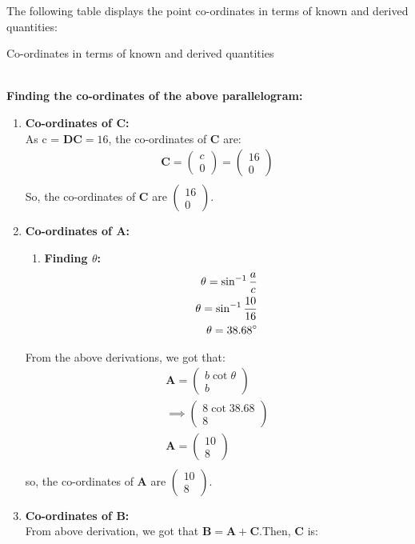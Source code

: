 \documentclass{article}
\newcommand{\myvec}[1]{\ensuremath{\begin{pmatrix}#1\end{pmatrix}}}
\let\vec\mathbf
\begin{document}
\pagebreak
The following table displays the point co-ordinates in terms of known and derived quantities:\\
\begin{table}[h]
	\centering
	
	\caption{Co-ordinates in terms of known and derived quantities}
	\label{tab:table5}
\end{table}\\
\textbf{Finding the co-ordinates of the above parallelogram:}\\
\begin{enumerate}
	\item \textbf{Co-ordinates of $\vec{C}$:}\\
		As c = $\vec{DC} = 16$, the co-ordinates of $\vec{C}$ are:
		\begin{align}
			\vec{C} = \myvec{c\\0} = \myvec{16\\0}\\
		\end{align}
So, the co-ordinates of $\vec{C}$ are $\myvec{16\\0}$.
\item \textbf{Co-ordinates of $\vec{A}$:}\\
	\begin{enumerate}
		\item \textbf{Finding $\theta$:}\\
			\begin{align}
				\theta = \sin^{-1}\frac{a}{c}\\
				\theta = \sin^{-1}\frac{10}{16}\\
				\theta = 38.68\degree\\
			\end{align}
	\end{enumerate}
From the above derivations, we got that:\\
			\begin{align}
				\vec{A} = \myvec{b\cot{\theta}\\b}\\
				\implies \myvec{8\cot{38.68}\\8}\\
				\vec{A} = \myvec{10\\8}\\
			\end{align}
so, the co-ordinates of $\vec{A}$ are $\myvec{10\\8}$.
\item \textbf{Co-ordinates of $\vec{B}$:}\\
	From above derivation, we got that $\vec{B} = \vec{A} + \vec{C}$.Then, $\vec{C}$ is:\\

\end{enumerate}
\end{document}
